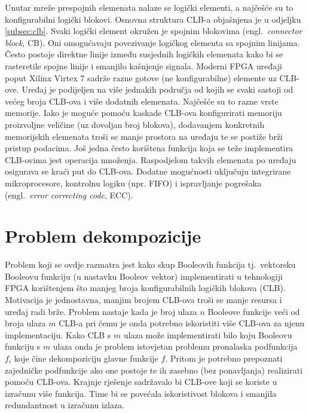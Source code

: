 \documentclass[times, utf8, diplomski]{fer}
\begin{document}
Unutar mreže prespojnih elemenata nalaze se logički elementi, a najčešće su to konfigurabilni logički blokovi. Osnovna struktura CLB-a objašnjena je u odjeljku \ref{subsec:clb}. Svaki logički element okružen je spojnim blokovima (engl.~\textit{connector block}, CB). Oni omogućavaju povezivanje logičkog elementa sa spojnim linijama. Često postoje direktne linije između susjednih logičkih elemenata kako bi se rasteretile spojne linije i smanjilo kašnjenje signala. Moderni FPGA uređaji poput Xilinx Virtex 7 sadrže razne gotove (ne konfigurabilne) elemente uz CLB-ove. Uređaj je podijeljen na više jednakih područja od kojih se svaki sastoji od većeg broja CLB-ova i više dodatnih elemenata. Najčešće su to razne vrste memorije. Iako je moguće pomoću kaskade CLB-ova konfigurirati memoriju proizvoljne veličine (uz dovoljan broj blokova), dodavanjem konkretnih memorijskih elemenata troši se manje prostora na uređaju te se postiže brži pristup podacima. Još jedna često korištena funkcija koja se teže implementira CLB-ovima jest operacija množenja. Raspodjelom takvih elemenata po uređaju osigurava se kraći put do CLB-ova. Dodatne mogućnosti uključuju integrirane mikroprocesore, kontrolnu logiku (npr. FIFO) i ispravljanje pogrešaka (engl.~\textit{error correcting code}, ECC).


\section{Problem dekompozicije} \label{sec:decomposition}

Problem koji se ovdje razmatra jest kako skup Booleovih funkcija tj.~vektorsku Booleovu funkciju (u nastavku Booleov vektor) implementirati u tehnologiji FPGA korištenjem što manjeg broja konfigurabilnih logičkih blokova (CLB). Motivacija je jednostavna, manjim brojem CLB-ova troši se manje resursa i uređaj radi brže. Problem nastaje kada je broj ulaza $n$ Booleove funkcije veći od broja ulaza $m$ CLB-a pri čemu je onda potrebno iskoristiti više CLB-ova za njenu implementaciju. Kako CLB s $m$ ulaza može implementirati bilo koju Booleovu funkciju s $m$ ulaza onda je problem istovjetan problemu pronalaska podfunkcija $f_{i}$ koje čine dekompoziciju glavne funkcije $f$. Pritom je potrebno prepoznati zajedničke podfunkcije ako one postoje te ih zasebno (bez ponavljanja) realizirati pomoću CLB-ova. Krajnje rješenje sadržavalo bi CLB-ove koji se koriste u izračunu više funkcija. Time bi se povećala iskoristivost blokova i smanjila redundantnost u izračunu izlaza.
\end{document}
